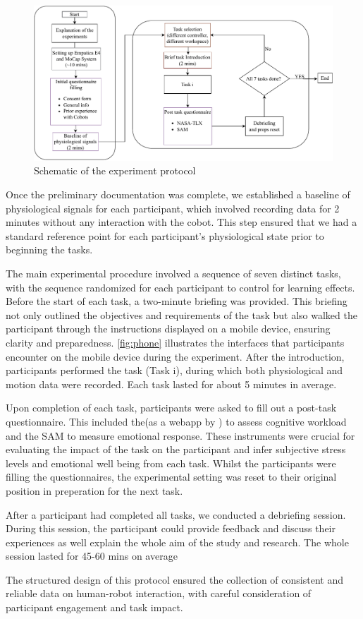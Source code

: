 \begin{figure}[h]
	\centering
	\includegraphics[width=\columnwidth]{images/expschematic.drawio.pdf}
	\caption{Schematic of the experiment protocol}
	\label{fig:prot}
\end{figure}

Once the preliminary documentation was complete, we established a baseline of physiological signals for each participant, which involved recording data for 2 minutes without any interaction with the cobot. This step ensured that we had a standard reference point for each participant's physiological state prior to beginning the tasks.

The main experimental procedure involved a sequence of seven distinct tasks, with the sequence randomized for each participant to control for learning effects.
Before the start of each task, a two-minute briefing was provided. This briefing not only outlined the objectives and requirements of the task but also walked the participant through the instructions displayed on a mobile device, ensuring clarity and preparedness. \autoref{fig:phone} illustrates the interfaces that participants encounter on the mobile device during the experiment. After the introduction, participants performed the task (Task i), during which both physiological and motion data were recorded. Each task lasted for about 5 minutes in average.



Upon completion of each task, participants were asked to fill out a post-task questionnaire. This included the(as a webapp by \textcite{pandian}) to assess cognitive workload and the \gls{SAM} to measure emotional response. These instruments were crucial for evaluating the impact of the task on the participant and infer subjective stress levels and emotional well being from each task. Whilst the participants were filling the questionnaires, the experimental setting was reset to their original position in preperation for the next task.

 After a participant had completed all tasks, we conducted a debriefing session. During this session, the participant could provide feedback and discuss their experiences as well explain the whole aim of the study and research. The whole session lasted for 45-60 mins on average 

The structured design of this protocol ensured the collection of consistent and reliable data on human-robot interaction, with careful consideration of participant engagement and task impact.